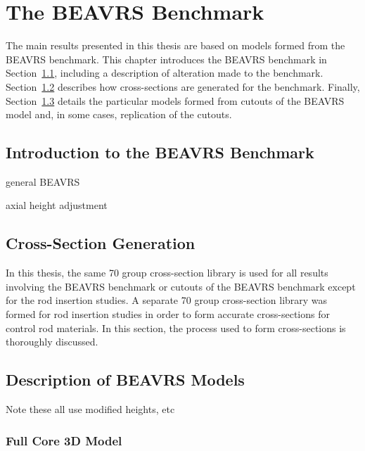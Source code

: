 \chapter{The BEAVRS Benchmark}
\label{chap:beavrs}

The main results presented in this thesis are based on models formed from the BEAVRS benchmark. This chapter introduces the BEAVRS benchmark in Section~\ref{sec:beavrs-intro}, including a description of alteration made to the benchmark. Section~\ref{sec:beavrs-xs-gen} describes how cross-sections are generated for the benchmark. Finally, Section~\ref{sec:beavrs-models} details the particular models formed from cutouts of the BEAVRS model and, in some cases, replication of the cutouts.

\section{Introduction to the BEAVRS Benchmark}
\label{sec:beavrs-intro}

general BEAVRS

axial height adjustment


\section{Cross-Section Generation}
\label{sec:beavrs-xs-gen}

In this thesis, the same 70 group cross-section library is used for all results involving the BEAVRS benchmark or cutouts of the BEAVRS benchmark except for the rod insertion studies. A separate 70 group cross-section library was formed for rod insertion studies in order to form accurate cross-sections for control rod materials. In this section, the process used to form cross-sections is thoroughly discussed.


\section{Description of BEAVRS Models}
\label{sec:beavrs-models}

Note these all use modified heights, etc

\subsection{Full Core 3D Model}
\label{sec:beavrs-3D}

